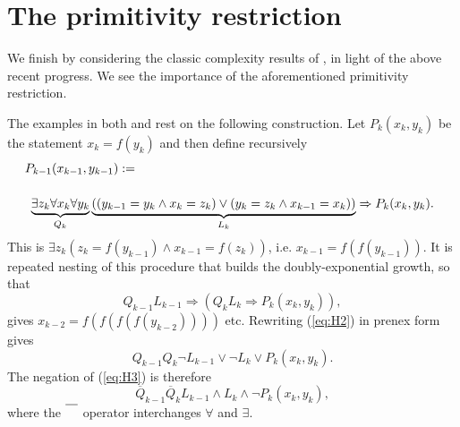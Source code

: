 \documentclass{llncs}
\begin{document}
\section{The primitivity restriction}
\label{SEC-Primitive}

We finish by considering the classic complexity results of \cite{BD07},\cite{DH88} in light of the above recent progress.  We see the importance of the aforementioned primitivity restriction.

The examples in both \cite{BD07} and \cite{DH88} rest on the following construction.
Let $P_k(x_k,y_k)$ be the statement $x_k=f(y_k)$ and then define recursively
\begin{align}
&P_{k-1}(x_{k-1},y_{k-1}) := \label{eq:H} \\
&\begin{array}{c}
\cr\underbrace{\exists z_k\forall x_k\forall y_k}_{Q_k}\underbrace{\left((y_{k-1}=y_k\land x_{k}=z_k)\lor(y_{k}=z_k\land x_{k-1}=x_k)\right)}_{L_k}\Rightarrow P_k(x_k,y_k).
\end{array} \nonumber
\end{align}
This is $\exists z_k \left(z_k=f(y_{k-1})\land x_{k-1}=f(z_k)\right)$, i.e. $x_{k-1}=f(f(y_{k-1}))$. It is repeated nesting of this procedure that builds the doubly-exponential growth, so that 
\begin{equation}\label{eq:H2}
Q_{k-1}L_{k-1}\Rightarrow \left(Q_kL_k\Rightarrow P_k(x_k,y_k)\right),
\end{equation}
gives $x_{k-2}=f(f(f(f(y_{k-2}))))$ etc.
Rewriting (\ref{eq:H2}) in prenex form gives 
\begin{equation}\label{eq:H3}
Q_{k-1}Q_k \neg L_{k-1}\lor\neg L_k\lor P_k(x_k,y_k).
\end{equation}
The negation of  (\ref{eq:H3}) is therefore
\begin{equation}\label{eq:H4}
\overline Q_{k-1}\overline Q_k  L_{k-1}\land L_k\land\neg P_k(x_k,y_k),
\end{equation}
where the $\overline{\strut\quad}$ operator interchanges $\forall$ and $\exists$.
\end{document}
